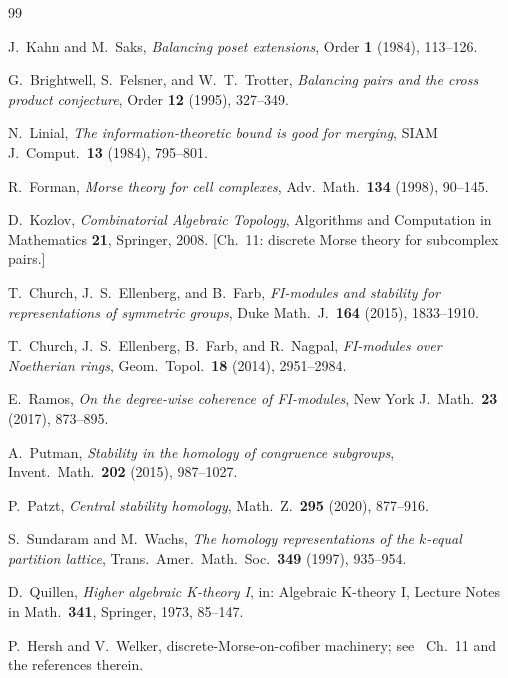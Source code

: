 \documentclass[11pt,reqno]{amsart}
\theoremstyle{plain}
\theoremstyle{definition}
\begin{document}
\begin{thebibliography}{99}

J.~Kahn and M.~Saks,
\emph{Balancing poset extensions},
Order \textbf{1} (1984), 113--126.

G.~Brightwell, S.~Felsner, and W.~T.~Trotter,
\emph{Balancing pairs and the cross product conjecture},
Order \textbf{12} (1995), 327--349.

N.~Linial,
\emph{The information-theoretic bound is good for merging},
SIAM J.\ Comput.\ \textbf{13} (1984), 795--801.

R.~Forman,
\emph{Morse theory for cell complexes},
Adv.\ Math.\ \textbf{134} (1998), 90--145.

D.~Kozlov,
\emph{Combinatorial Algebraic Topology},
Algorithms and Computation in Mathematics \textbf{21}, Springer, 2008.
[Ch.~11: discrete Morse theory for subcomplex pairs.]

T.~Church, J.~S.~Ellenberg, and B.~Farb,
\emph{FI-modules and stability for representations of symmetric groups},
Duke Math.\ J.\ \textbf{164} (2015), 1833--1910.

T.~Church, J.~S.~Ellenberg, B.~Farb, and R.~Nagpal,
\emph{FI-modules over Noetherian rings},
Geom.\ Topol.\ \textbf{18} (2014), 2951--2984.

E.~Ramos,
\emph{On the degree-wise coherence of FI-modules},
New York J.\ Math.\ \textbf{23} (2017), 873--895.

A.~Putman,
\emph{Stability in the homology of congruence subgroups},
Invent.\ Math.\ \textbf{202} (2015), 987--1027.

P.~Patzt,
\emph{Central stability homology},
Math.\ Z.\ \textbf{295} (2020), 877--916.

S.~Sundaram and M.~Wachs,
\emph{The homology representations of the $k$-equal partition lattice},
Trans.\ Amer.\ Math.\ Soc.\ \textbf{349} (1997), 935--954.

D.~Quillen,
\emph{Higher algebraic K-theory I},
in: Algebraic K-theory I, Lecture Notes in Math.\ \textbf{341},
Springer, 1973, 85--147.

P.~Hersh and V.~Welker,
discrete-Morse-on-cofiber machinery; see~\cite{Kozlov2008} Ch.~11 and
the references therein.

\end{thebibliography}
\end{document}
